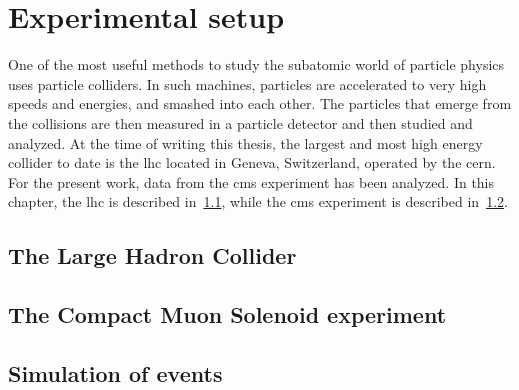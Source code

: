 \chapter{Experimental setup}

One of the most useful methods to study the subatomic world of particle physics uses particle colliders. In such machines, particles are accelerated to very high speeds and energies, and smashed into each other. The particles that emerge from the collisions are then measured in a particle detector and then studied and analyzed. At the time of writing this thesis, the largest and most high energy collider to date is the \gls{lhc} located in Geneva, Switzerland, operated by the \gls{cern}. For the present work, data from the \gls{cms} experiment has been analyzed. In this chapter, the \gls{lhc} is described in~\ref{sec:lhc},  while the \gls{cms} experiment is described in~\ref{sec:cms}.

\section{The Large Hadron Collider}
\label{sec:lhc}

\section{The Compact Muon Solenoid experiment}
\label{sec:cms}



\section{Simulation of events}
